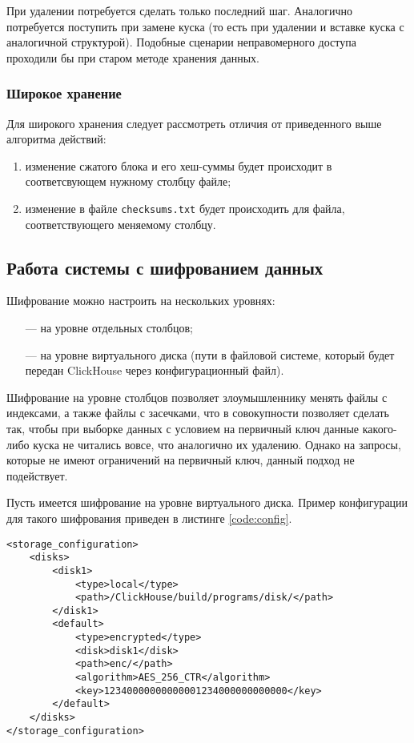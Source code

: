 При удалении потребуется сделать только последний шаг. Аналогично потребуется поступить при замене куска (то есть при удалении и вставке куска с аналогичной структурой). Подобные сценарии неправомерного доступа проходили бы при старом методе хранения данных.

\subsubsection{Широкое хранение}

Для широкого хранения следует рассмотреть отличия от приведенного выше алгоритма действий:
\begin{enumerate}
    \item изменение сжатого блока и его хеш-суммы будет происходит в соответсвующем нужному столбцу файле;
    \item изменение в файле \texttt{checksums.txt} будет происходить для файла, соответствующего меняемому столбцу.
\end{enumerate}

\subsection{Работа системы с шифрованием данных}

Шифрование можно настроить на нескольких уровнях:
\begin{itemize}
    \item [---] на уровне отдельных столбцов;
    \item [---] на уровне виртуального диска (пути в файловой системе, который будет передан ClickHouse через конфигурационный файл).
\end{itemize}

Шифрование на уровне столбцов позволяет злоумышленнику менять файлы с индексами, а также файлы с засечками, что в совокупности позволяет сделать так, чтобы при выборке данных с условием на первичный ключ данные какого-либо куска не читались вовсе, что аналогично их удалению. Однако на запросы, которые не имеют ограничений на первичный ключ, данный подход не подействует.

Пусть имеется шифрование на уровне виртуального диска. Пример конфигурации для такого шифрования приведен в листинге \ref{code:config}.

\begin{lstlisting}[label=code:config, caption={Параметры конфигурации для шифрования на уровне диска.}]
<storage_configuration>
    <disks>
        <disk1>
            <type>local</type>
            <path>/ClickHouse/build/programs/disk/</path>
        </disk1>
        <default>
            <type>encrypted</type>
            <disk>disk1</disk>
            <path>enc/</path>
            <algorithm>AES_256_CTR</algorithm>
            <key>12340000000000001234000000000000</key>
        </default>
    </disks>
</storage_configuration>
\end{lstlisting}


